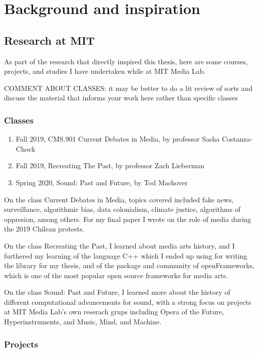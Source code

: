 \chapter{Background and inspiration}

\section{Research at MIT}

As part of the research that directly inspired this thesis, here are some courses, projects, and studies I have undertaken while at MIT Media Lab.

COMMENT ABOUT CLASSES: it may be better to do a lit review of sorts and discuss the material that informs your work here rather than specific classes

\subsection{Classes}

\begin{enumerate}
  \item Fall 2019, CMS.901 Current Debates in Media, by professor Sasha Costanza-Chock
  \item Fall 2019, Recreating The Past, by professor Zach Lieberman
  \item Spring 2020, Sound: Past and Future, by Tod Machover
\end{enumerate}

On the class Current Debates in Media, topics covered included fake news, surveillance, algorithmic bias, data colonialism, climate justice, algorithms of oppresion, among others. For my final paper I wrote on the role of media during the 2019 Chilean protests.

On the class Recreating the Past, I learned about media arts history, and I furthered my learning of the language C++ which I ended up using for writing the library for my thesis, and of the package and community of openFrameworks, which is one of the most popular open source frameworks for media arts.

On the class Sound: Past and Future, I learned more about the history of different computational advancements for sound, with a strong focus on projects at MIT Media Lab's own reserach grups including Opera of the Future, Hyperinstruments, and Music, Mind, and Machine.

\subsection{Projects}

